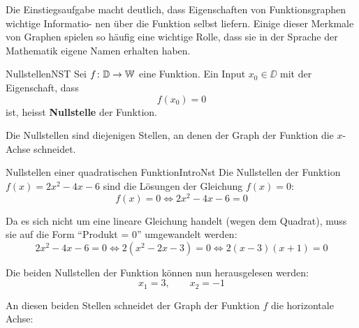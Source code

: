\clearpage
Die Einstiegsaufgabe macht deutlich, dass Eigenschaften von Funktionsgraphen wichtige Informatio-
nen über die Funktion selbst liefern. Einige dieser Merkmale von Graphen spielen so häufig eine wichtige Rolle, dass sie in der Sprache der Mathematik eigene Namen erhalten haben.
\begin{definition}
    {Nullstellen}{NST}
    Sei \(f\colon \mathbb{D} \to \mathbb{W}\) eine Funktion. Ein Input \(x_0 \in \DD\)
    mit der Eigenschaft, dass
    \[
        f(x_0)=0
    \]
    ist, heisst \textbf{Nullstelle} der Funktion.

    Die Nullstellen sind diejenigen Stellen, an denen der Graph
    der Funktion die \(x\)-Achse schneidet.
\end{definition}

\begin{bsp}
    {Nullstellen einer quadratischen Funktion}{IntroNst}
    Die Nullstellen der Funktion \(f(x)=2x^2-4x-6\) sind
    die Lösungen der Gleichung \(f(x)=0\):
    \[
        f(x)=0 \iff 2x^2-4x-6=0
    \]

    Da es sich nicht um eine lineare Gleichung handelt
    (wegen dem Quadrat), muss sie auf die Form
    \enquote{Produkt = 0} umgewandelt werden:
    \[
        2x^2-4x-6=0
        \iff 2(x^2-2x-3)=0
        \iff 2(x-3)(x+1)=0
    \]

    Die beiden Nullstellen der Funktion können nun
    herausgelesen werden:
    \[
        x_1=3,\qquad x_2=-1
    \]

    An diesen beiden Stellen schneidet der Graph der Funktion
    \(f\) die horizontale Achse:

    \begin{center}
\end{center}
\end{bsp}
